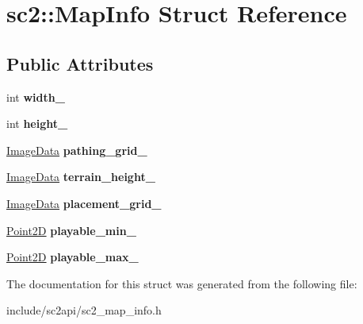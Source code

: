 \hypertarget{structsc2_1_1_map_info}{}\section{sc2\+:\+:Map\+Info Struct Reference}
\label{structsc2_1_1_map_info}
\subsection*{Public Attributes}
\begin{DoxyCompactItemize}
\item 
\mbox{\label{structsc2_1_1_map_info_a98975e5449a6b8ac6be9e257cdbbf14c}} 
int {\bfseries width\+\_\+}
\item 
\mbox{\label{structsc2_1_1_map_info_afb37770a394d3acd7907d8410be8c7ab}} 
int {\bfseries height\+\_\+}
\item 
\mbox{\label{structsc2_1_1_map_info_afaf7094106eb825f21cbcb5bc2a31365}} 
\hyperlink{structsc2_1_1_image_data}{Image\+Data} {\bfseries pathing\+\_\+grid\+\_\+}
\item 
\mbox{\label{structsc2_1_1_map_info_adfe803983accc0e140cd73f4a4967693}} 
\hyperlink{structsc2_1_1_image_data}{Image\+Data} {\bfseries terrain\+\_\+height\+\_\+}
\item 
\mbox{\label{structsc2_1_1_map_info_a1d6545fdc122113fdb872e7920e63a03}} 
\hyperlink{structsc2_1_1_image_data}{Image\+Data} {\bfseries placement\+\_\+grid\+\_\+}
\item 
\mbox{\label{structsc2_1_1_map_info_a3f1a8b5d060600672b9c41b673a5599d}} 
\hyperlink{structsc2_1_1_point2_d}{Point2D} {\bfseries playable\+\_\+min\+\_\+}
\item 
\mbox{\label{structsc2_1_1_map_info_af92884842e55027054e835e207908de3}} 
\hyperlink{structsc2_1_1_point2_d}{Point2D} {\bfseries playable\+\_\+max\+\_\+}
\end{DoxyCompactItemize}


The documentation for this struct was generated from the following file\+:\begin{DoxyCompactItemize}
\item 
include/sc2api/sc2\+\_\+map\+\_\+info.\+h\end{DoxyCompactItemize}
